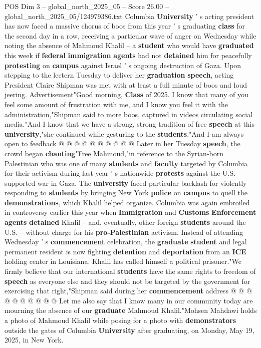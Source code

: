 \begin{textsample}{POS Dim 3 – global\_north\_2025\_05 – Score 26.00 – global\_north\_2025\_05/124979386.txt}  \label{ex:f3_pos_146}
Columbia \textbf{University} ' s acting president has now faced a massive chorus of boos from this year ' s graduating \textbf{class} for the second day in a row, receiving a particular wave of anger on Wednesday while noting the absence of Mahmoud Khalil -- a \textbf{student} who would have \textbf{graduated} this week if \textbf{federal} \textbf{immigration} \textbf{agents} had not \textbf{detained} him for peacefully \textbf{protesting} on \textbf{campus} against Israel ' s ongoing destruction of Gaza.
Upon stepping to the lectern Tuesday to deliver her \textbf{graduation} \textbf{speech}, acting President Claire Shipman was met with at least a full minute of boos and loud jeering.
Advertisement"Good morning, \textbf{Class} of 2025.
I know that many of you feel some amount of frustration with me, and I know you feel it with the administration,"Shipman said to more boos, captured in videos circulating social media."And I know that we have a strong, strong tradition of free \textbf{speech} at this \textbf{university},"she continued while gesturing to the \textbf{students}."And I am always open to feedback @ @ @ @ @ @ @ @ @ @ Later in her Tuesday \textbf{speech}, the crowd began \textbf{chanting}"Free Mahmoud,"in reference to the Syrian-born Palestinian who was one of many \textbf{students} and \textbf{faculty} targeted by Columbia for their activism during last year ' s nationwide \textbf{protests} against the U.S.-supported war in Gaza.
The \textbf{university} faced particular backlash for violently responding to \textbf{students} by bringing New York \textbf{police} on \textbf{campus} to quell the \textbf{demonstrations}, which Khalil helped organize.
Columbia was again embroiled in controversy earlier this year when \textbf{Immigration} and \textbf{Customs} \textbf{Enforcement} \textbf{agents} \textbf{detained} Khalil -- and, eventually, other foreign \textbf{students} around the U.S. -- without charge for his \textbf{pro-Palestinian} activism.
Instead of attending Wednesday ' s \textbf{commencement} celebration, the \textbf{graduate} \textbf{student} and legal permanent resident is now fighting \textbf{detention} and \textbf{deportation} from an \textbf{ICE} holding center in Louisiana.
Khalil has called himself a political prisoner."We firmly believe that our international \textbf{students} have the same rights to freedom of \textbf{speech} as everyone else and they should not be targeted by the government for exercising that right,"Shipman said during her \textbf{commencement} address @ @ @ @ @ @ @ @ @ @ Let me also say that I know many in our community today are mourning the absence of our \textbf{graduate} Mahmoud Khalil."Mohsen Mahdawi holds a photo of Mahmoud Khalil while posing for a photo with \textbf{demonstrators} outside the gates of Columbia \textbf{University} after graduating, on Monday, May 19, 2025, in New York.

\end{textsample}
